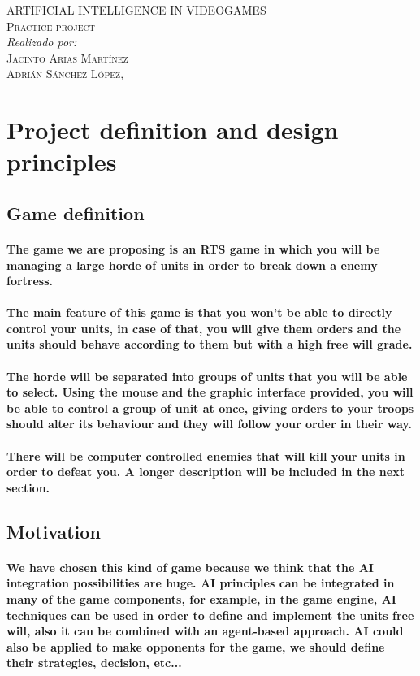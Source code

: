 \documentclass[a4paper,10pt]{article}
\newcommand{\titulo}[2]{ \begin{titlepage}\begin{center}\vspace*{\fill}\textsc{\Huge #1}\\[5cm]\textsc{\Large \underline{#2}}\\[5cm]\emph{Realizado por:}\\ \textsc{Jacinto Arias Martínez}\\ \textsc{Adrián Sánchez López}\vspace*{\fill}\vfill\monthname[\the\month],\, \the\year\end{center}\end{titlepage}}
\newcommand{\p}[1]{\paragraph{\indent\textnormal{#1}}}
\begin{document}
 \titulo{ARTIFICIAL INTELLIGENCE IN VIDEOGAMES}{Practice project}

    \begin{abstract}
    
    \end{abstract}

  \newpage

  \vspace*{3cm}
  \tableofcontents
  \vspace*{\fill}

\newpage
\section{Project definition and design principles}

  \subsection{Game definition}

    \p{The game we are proposing is an RTS game in which you will be managing a large horde of units in order to break down a enemy fortress.}

    \p{The main feature of this game is that you won't be able to directly control your units, in case of that, you will give them orders and the units should behave according to them but with a high free will grade.}

    \p{The horde will be separated into groups of units that you will be able to select. Using the mouse and the graphic interface provided, you will be able to control a group of unit at once, giving orders to your troops should alter its behaviour and they will follow your order in their way.}

    \p{There will be computer controlled enemies that will kill your units in order to defeat you. A longer description will be included in the next section.}


  \subsection{Motivation}

    \p{We have chosen this kind of game because we think that the AI integration possibilities are huge. AI principles can be integrated in many of the game components, for example, in the game engine, AI techniques can be used in order to define and implement the units free will, also it can be combined with an agent-based approach. AI could also be applied to make opponents for the game, we should define their strategies, decision, etc...}
\end{document}
